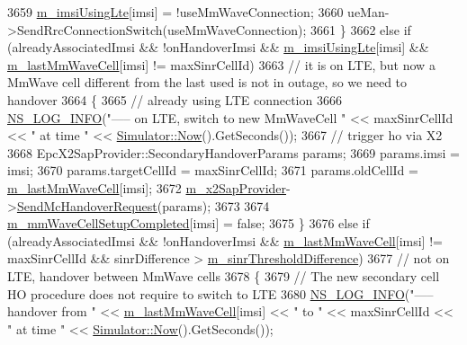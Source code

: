\begin{DoxyCode}
3659       \hyperlink{classns3_1_1LteEnbRrc_a99427e888b10d095491e72bf062511db}{m\_imsiUsingLte}[imsi] = !useMmWaveConnection;
3660       ueMan->SendRrcConnectionSwitch(useMmWaveConnection);
3661     \}
3662     \textcolor{keywordflow}{else} \textcolor{keywordflow}{if} (alreadyAssociatedImsi && !onHandoverImsi && \hyperlink{classns3_1_1LteEnbRrc_a99427e888b10d095491e72bf062511db}{m\_imsiUsingLte}[imsi] && 
      \hyperlink{classns3_1_1LteEnbRrc_a0d7b04f0383b0dc3f6a7360b87cbaeee}{m\_lastMmWaveCell}[imsi] != maxSinrCellId)
3663     \textcolor{comment}{// it is on LTE, but now a MmWave cell different from the last used is not in outage, so we need to
       handover}
3664     \{
3665       \textcolor{comment}{// already using LTE connection}
3666       \hyperlink{group__logging_gafbd73ee2cf9f26b319f49086d8e860fb}{NS\_LOG\_INFO}(\textcolor{stringliteral}{"----- on LTE, switch to new MmWaveCell "} << maxSinrCellId << \textcolor{stringliteral}{" at time "} << 
      \hyperlink{classns3_1_1Simulator_ac3178fa975b419f7875e7105be122800}{Simulator::Now}().GetSeconds());
3667       \textcolor{comment}{// trigger ho via X2}
3668       EpcX2SapProvider::SecondaryHandoverParams params;
3669       params.imsi = imsi;
3670       params.targetCellId = maxSinrCellId;
3671       params.oldCellId = \hyperlink{classns3_1_1LteEnbRrc_a0d7b04f0383b0dc3f6a7360b87cbaeee}{m\_lastMmWaveCell}[imsi];
3672       \hyperlink{classns3_1_1LteEnbRrc_ae8dc75f4f6f63b7736d86204a4beb415}{m\_x2SapProvider}->\hyperlink{classns3_1_1EpcX2SapProvider_a419d10f3f7f1808938a53439bed4f9eb}{SendMcHandoverRequest}(params);
3673 
3674       \hyperlink{classns3_1_1LteEnbRrc_ad19d6f4c123115e1d13e34609781ab20}{m\_mmWaveCellSetupCompleted}[imsi] = \textcolor{keyword}{false};
3675     \}
3676     \textcolor{keywordflow}{else} \textcolor{keywordflow}{if} (alreadyAssociatedImsi && !onHandoverImsi && \hyperlink{classns3_1_1LteEnbRrc_a0d7b04f0383b0dc3f6a7360b87cbaeee}{m\_lastMmWaveCell}[imsi] != 
      maxSinrCellId && sinrDifference > \hyperlink{classns3_1_1LteEnbRrc_aef56a65c644f6ed3c5f28a540ded624f}{m\_sinrThresholdDifference}) 
3677     \textcolor{comment}{// not on LTE, handover between MmWave cells}
3678     \{
3679       \textcolor{comment}{// The new secondary cell HO procedure does not require to switch to LTE}
3680       \hyperlink{group__logging_gafbd73ee2cf9f26b319f49086d8e860fb}{NS\_LOG\_INFO}(\textcolor{stringliteral}{"----- handover from "} << \hyperlink{classns3_1_1LteEnbRrc_a0d7b04f0383b0dc3f6a7360b87cbaeee}{m\_lastMmWaveCell}[imsi] << \textcolor{stringliteral}{" to "} << 
      maxSinrCellId << \textcolor{stringliteral}{" at time "} << \hyperlink{classns3_1_1Simulator_ac3178fa975b419f7875e7105be122800}{Simulator::Now}().GetSeconds());

\end{DoxyCode}
